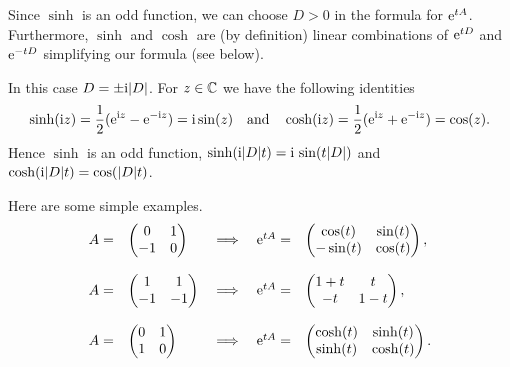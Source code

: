 \begin{description}[wide,  labelindent=0em]

\item[$D^2 > 0$: ]
Since $ \sinh $  is an odd function, we can choose  $ D > 0 $ in the formula for $  \mathrm{e}^{tA} $.
Furthermore, $ \sinh $ and $ \cosh $ are (by definition) linear combinations of\/ $  \mathrm{e}^{tD} $ and 
$  \mathrm{e}^{-tD} $ simplifying our formula (see below).

\item[$D^2 < 0$: ] 
In this case $D = \pm \mathrm{i}|D|$.
For $ z \in \mathbb{C} $ we have the following identities
%
\[
	\sinh(\mathrm{i} z) = \frac{1}{2}(  \mathrm{e}^{\mathrm{i} z} -  \mathrm{e}^{-\mathrm{i} z}) = \mathrm{i} \sin(z)
	\quad \text{and} \quad
	\cosh(\mathrm{i} z) = \frac{1}{2}(  \mathrm{e}^{ \mathrm{i} z} +  \mathrm{e}^{- \mathrm{i} z}) = \cos(z). 
\]
%
Hence $ \sinh $ is an odd function,  $\sinh(\mathrm{i} |D| t ) = \mathrm{i} \, \sin(t|D|)$ and 
$\cosh(\mathrm{i} |D| t ) = \cos(|D| t )$.
\end{description}
Here are some simple examples.
\newcommand{\ABC}{\begin{pmatrix}	0 & 1 \\ -1 & 0	\end{pmatrix}}
\newcommand{\BBC}{\begin{pmatrix}	\cos(t) & \sin(t) \\ - \sin(t) & \cos(t) \end{pmatrix}}
\newcommand{\CBC}{\begin{pmatrix}	1 & 1 \\ -1 & -1 \end{pmatrix}}
\newcommand{\DBC}{\begin{pmatrix}	1+t & t \\ - t & 1-t \end{pmatrix}}
\newcommand{\EBC}{\begin{pmatrix}	0 & 1 \\ 1 &0 \end{pmatrix}}
\newcommand{\FBC}{\begin{pmatrix}	\cosh(t) & \sinh(t) \\ \sinh(t) & \cosh(t) \end{pmatrix}}
\[
  \begin{array}{lllll}
    A= & \ABC & \implies &  \eu^{tA}= & \BBC , \\\\
    A= & \CBC & \implies &  \eu^{tA}= & \DBC , \\\\ 
    A= & \EBC & \implies &  \eu^{tA}= & \FBC  .
  \end{array}
\]

